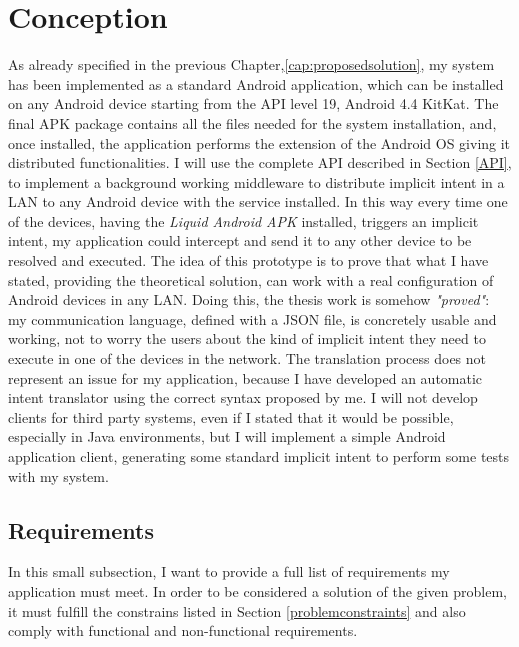\section{Conception}
As already specified in the previous Chapter,\ref{cap:proposedsolution}, my system has been implemented as a standard Android application, which can be installed on any Android device starting from the API level 19, Android 4.4 KitKat. The final APK package contains all the files needed for the system installation, and, once installed, the application performs the extension of the Android OS giving it distributed functionalities. I will use the complete API described in Section \ref{API}, to implement a background working middleware to distribute implicit intent in a LAN to any Android device with the service installed. In this way every time one of the devices, having the \textit{Liquid Android APK}
installed, triggers an implicit intent, my application could intercept and send it to any other device to be resolved and executed. The idea of this prototype is to prove that what I have stated, providing the theoretical solution, can work with a real configuration of Android devices in any LAN. Doing this, the thesis work is somehow \textit{"proved"}: my communication language, defined with a JSON file, is concretely usable and working, not to worry the users about the kind of implicit intent they need to execute in one of the devices in the network. The translation process does not represent an issue for my application, because I have developed an automatic intent translator using the correct syntax proposed by me. I will not develop clients for third party systems, even if I stated that it would be possible, especially in Java environments, but I will implement a simple Android application client, generating some standard implicit intent to perform some tests with my system.
\subsection{Requirements}
In this small subsection, I want to provide a full list of requirements my application must meet. In order to be considered a solution of the given problem, it must fulfill the constrains listed in Section \ref{problemconstraints} and also comply with functional and non-functional requirements.

